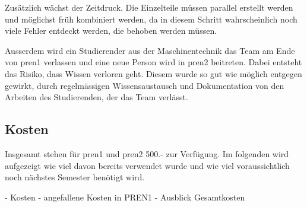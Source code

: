 Zusätzlich wächst der Zeitdruck. Die Einzelteile müssen parallel erstellt werden und möglichst früh kombiniert werden, da in diesem Schritt wahrscheinlich noch viele Fehler entdeckt werden, die behoben werden müssen. 

Ausserdem wird ein Studierender aus der Maschinentechnik das Team am Ende von \acrshort{pren1} verlassen und eine neue Person wird in \acrshort{pren2} beitreten. Dabei entsteht das Risiko, dass Wissen verloren geht. Diesem wurde so gut wie möglich entgegen gewirkt, durch regelmässigen Wissensaustausch und Dokumentation von den Arbeiten des Studierenden, der das Team verlässt.

\subsection{Kosten}\label{kosten}

Insgesamt stehen für \acrshort{pren1} und \acrshort{pren2} 500.- zur Verfügung. Im folgenden wird aufgezeigt wie viel davon bereits verwendet wurde und wie viel voraussichtlich noch nächstes Semester benötigt wird.

- Kosten
- angefallene Kosten in PREN1
- Ausblick Gesamtkosten

